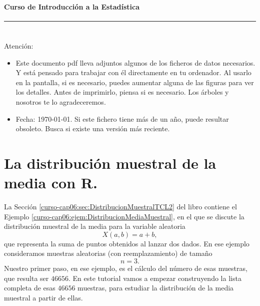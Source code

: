 \documentclass[10pt,a4paper]{article}\usepackage[]{graphicx}\usepackage[]{color}
\newcounter {cont01}
\begin{document}


\paragraph{\hspace{6.3cm}Curso de Introducción a la Estadística\\[2mm]} \noindent\hrule

\setcounter{section}{0}
\section*{\hspace{-0.1cm}} Atención:
\begin{itemize}
  \item Este documento pdf lleva adjuntos algunos de los ficheros de datos necesarios. Y está
      pensado para trabajar con él directamente en tu ordenador. Al usarlo en la pantalla, si es
      necesario, puedes aumentar alguna de las figuras para ver los detalles. Antes de
      imprimirlo, piensa si es necesario. Los árboles y nosotros te lo agradeceremos.
  \item Fecha: \today. Si este fichero tiene más de un año, puede resultar obsoleto. Busca si
      existe una versión más reciente.
\end{itemize}
\setcounter{tocdepth}{1}
\tableofcontents

\section{La distribución muestral de la media con R.}
\label{tut06:sec:DistribucionMuestralMediaR}

La Sección \ref{curso-cap06:sec:DistribucionMuestralTCL2} del libro contiene el Ejemplo
\ref{curso-cap06:ejem:DistribucionMediaMuestral}, en el que se discute la distribución
muestral de la media para la variable aleatoria
\[X(a,b)=a+b,\]
que representa la suma de puntos obtenidos al lanzar dos dados. En ese ejemplo consideramos muestras aleatorias (con reemplazamiento) de tamaño
\[n=3.\]
Nuestro primer paso, en ese ejemplo, es el cálculo del número de esas muestras, que resulta ser $46656$. En este tutorial vamos a empezar construyendo la lista completa de esas $46656$ muestras, para estudiar la distribución de la media muestral a partir de ellas.
\end{document}
